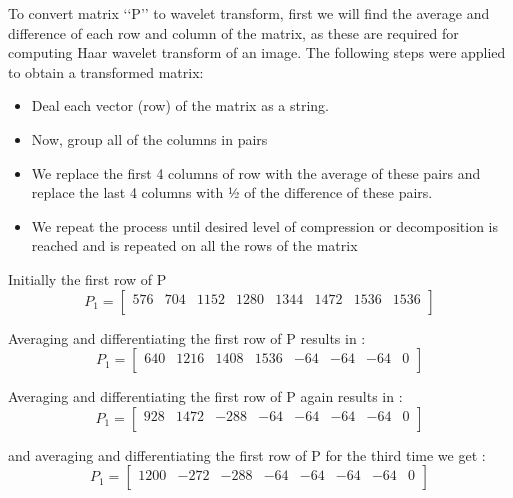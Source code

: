 \documentclass{article}
\begin{document}
\setlength{\parindent}{1cm}
To convert matrix ‘‘P’’ to wavelet transform, first we will find the average and difference of each row and column of the matrix, as these are required for computing Haar wavelet transform of an image. The following steps were applied to obtain a transformed matrix:
\begin{itemize}
    \item Deal each vector (row) of the matrix as a string. 
    \item Now, group all of the columns in pairs
    \item We replace the first 4 columns of row with the average of these pairs and replace the last 4 columns with ½ of the difference of these pairs.  
    \item We repeat the process until desired level of compression or decomposition is reached and is repeated on all the rows of the matrix
\end{itemize}

\setlength{\parindent}{1cm}
Initially the first row of P
\begin{equation*}
    P_1  = \begin{bmatrix}
        576 & 704 & 1152 & 1280 & 1344 & 1472 & 1536 & 1536 \\
    \end{bmatrix}
\end{equation*}

\setlength{\parindent}{1cm}
Averaging and differentiating the first row of P results in :
\begin{equation*}
    P_1 = \begin{bmatrix}
        640 & 1216 & 1408 & 1536 & -64 & -64 & -64 & 0 \\
    \end{bmatrix}
\end{equation*}

\setlength{\parindent}{1cm}
Averaging and differentiating the first row of P again results in :
\begin{equation*}
    P_1 = \begin{bmatrix}
        928 & 1472 & -288 & -64 & -64 & -64 & -64 & 0 \\
    \end{bmatrix}
\end{equation*}

\setlength{\parindent}{1cm}
and averaging and differentiating the first row of P for the third time we get :
\begin{equation*}
    P_1 = \begin{bmatrix}
        1200 & -272 & -288 & -64 & -64 & -64 & -64 & 0 \\
    \end{bmatrix}
\end{equation*}
\end{document}

